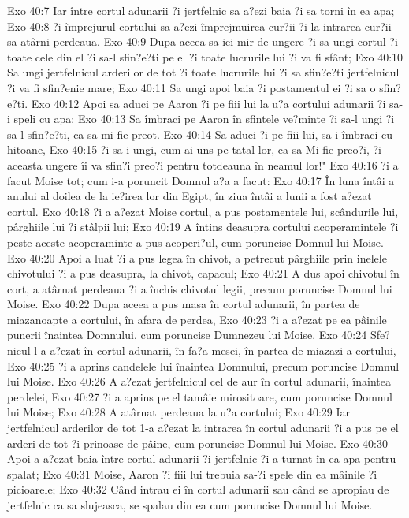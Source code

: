 Exo 40:7  Iar între cortul adunarii ?i jertfelnic sa a?ezi baia ?i sa torni în ea apa;
Exo 40:8  ?i împrejurul cortului sa a?ezi împrejmuirea cur?ii ?i la intrarea cur?ii sa atârni perdeaua.
Exo 40:9  Dupa aceea sa iei mir de ungere ?i sa ungi cortul ?i toate cele din el ?i sa-l sfin?e?ti pe el ?i toate lucrurile lui ?i va fi sfânt;
Exo 40:10  Sa ungi jertfelnicul arderilor de tot ?i toate lucrurile lui ?i sa sfin?e?ti jertfelnicul ?i va fi sfin?enie mare;
Exo 40:11  Sa ungi apoi baia ?i postamentul ei ?i sa o sfin?e?ti.
Exo 40:12  Apoi sa aduci pe Aaron ?i pe fiii lui la u?a cortului adunarii ?i sa-i speli cu apa;
Exo 40:13  Sa îmbraci pe Aaron în sfintele ve?minte ?i sa-l ungi ?i sa-l sfin?e?ti, ca sa-mi fie preot.
Exo 40:14  Sa aduci ?i pe fiii lui, sa-i îmbraci cu hitoane,
Exo 40:15  ?i sa-i ungi, cum ai uns pe tatal lor, ca sa-Mi fie preo?i, ?i aceasta ungere îi va sfin?i preo?i pentru totdeauna în neamul lor!"
Exo 40:16  ?i a facut Moise tot; cum i-a poruncit Domnul a?a a facut:
Exo 40:17  În luna întâi a anului al doilea de la ie?irea lor din Egipt, în ziua întâi a lunii a fost a?ezat cortul.
Exo 40:18  ?i a a?ezat Moise cortul, a pus postamentele lui, scândurile lui, pârghiile lui ?i stâlpii lui;
Exo 40:19  A întins deasupra cortului acoperamintele ?i peste aceste acoperaminte a pus acoperi?ul, cum poruncise Domnul lui Moise.
Exo 40:20  Apoi a luat ?i a pus legea în chivot, a petrecut pârghiile prin inelele chivotului ?i a pus deasupra, la chivot, capacul;
Exo 40:21  A dus apoi chivotul în cort, a atârnat perdeaua ?i a închis chivotul legii, precum poruncise Domnul lui Moise.
Exo 40:22  Dupa aceea a pus masa în cortul adunarii, în partea de miazanoapte a cortului, în afara de perdea,
Exo 40:23  ?i a a?ezat pe ea pâinile punerii înaintea Domnului, cum poruncise Dumnezeu lui Moise.
Exo 40:24  Sfe?nicul l-a a?ezat în cortul adunarii, în fa?a mesei, în partea de miazazi a cortului,
Exo 40:25  ?i a aprins candelele lui înaintea Domnului, precum poruncise Domnul lui Moise.
Exo 40:26  A a?ezat jertfelnicul cel de aur în cortul adunarii, înaintea perdelei,
Exo 40:27  ?i a aprins pe el tamâie mirositoare, cum poruncise Domnul lui Moise;
Exo 40:28  A atârnat perdeaua la u?a cortului;
Exo 40:29  Iar jertfelnicul arderilor de tot 1-a a?ezat la intrarea în cortul adunarii ?i a pus pe el arderi de tot ?i prinoase de pâine, cum poruncise Domnul lui Moise.
Exo 40:30  Apoi a a?ezat baia între cortul adunarii ?i jertfelnic ?i a turnat în ea apa pentru spalat;
Exo 40:31  Moise, Aaron ?i fiii lui trebuia sa-?i spele din ea mâinile ?i picioarele;
Exo 40:32  Când intrau ei în cortul adunarii sau când se apropiau de jertfelnic ca sa slujeasca, se spalau din ea cum poruncise Domnul lui Moise.
